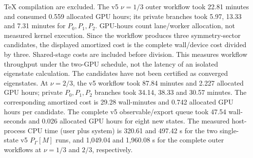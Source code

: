 \TeX{} compilation are excluded. The v5 $\nu=1/3$ outer workflow took
22.81 minutes and consumed 0.559 allocated GPU hours; its private branches
took 5.97, 13.33 and 7.31 minutes for $P_0,P_1,P_2$. GPU-hours count
lane/worker allocation, not measured kernel execution. Since the workflow
produces three symmetry-sector candidates, the displayed amortized cost is
the complete wall/device cost divided by three. Shared-stage costs are
included before division. This measures workflow throughput under the
two-GPU schedule, not the latency of an isolated eigenstate calculation. The
candidates have not been certified as converged eigenstates. At $\nu=2/3$,
the v5 workflow took 87.84 minutes and 2.227 allocated GPU hours; private
$P_0,P_1,P_2$ branches took 34.14, 38.33 and 30.57 minutes. The corresponding
amortized cost is 29.28 wall-minutes and 0.742 allocated GPU hours per
candidate. The complete v5 observable/export queue took 47.54 wall-seconds
and 0.026 allocated GPU hours for eight new states.
The measured host-process CPU time (user plus system) is 320.61 and 497.42 s
for the two single-state v5 $P_\Gamma[M]$ runs, and 1,049.04 and 1,960.08 s
for the complete outer workflows at $\nu=1/3$ and $2/3$, respectively.

